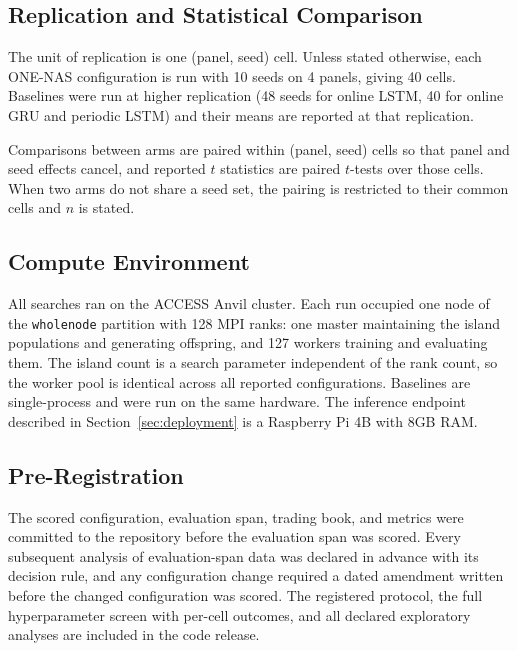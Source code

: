 \subsection{Replication and Statistical Comparison}

The unit of replication is one (panel, seed) cell. Unless stated
otherwise, each ONE-NAS configuration is run with 10 seeds on 4 panels,
giving 40 cells. Baselines were run at higher replication (48 seeds for
online LSTM, 40 for online GRU and periodic LSTM) and their means are
reported at that replication.

Comparisons between arms are paired within (panel, seed) cells so that
panel and seed effects cancel, and reported $t$ statistics are paired
$t$-tests over those cells. When two arms do not share a seed set, the
pairing is restricted to their common cells and $n$ is stated.

\subsection{Compute Environment}

All searches ran on the ACCESS Anvil cluster. Each run occupied one
node of the \texttt{wholenode} partition with 128 MPI ranks: one master
maintaining the island populations and generating offspring, and 127
workers training and evaluating them. The island count is a search
parameter independent of the rank count, so the worker pool is
identical across all reported configurations. Baselines are
single-process and were run on the same hardware. The inference
endpoint described in Section~\ref{sec:deployment} is a Raspberry Pi 4B with 8GB RAM.

\subsection{Pre-Registration}

The scored configuration, evaluation span, trading book, and metrics
were committed to the repository before the evaluation span was scored.
Every subsequent analysis of evaluation-span data was declared in
advance with its decision rule, and any configuration change required a
dated amendment written before the changed configuration was scored.
The registered protocol, the full hyperparameter screen with per-cell
outcomes, and all declared exploratory analyses are included in the
code release.


